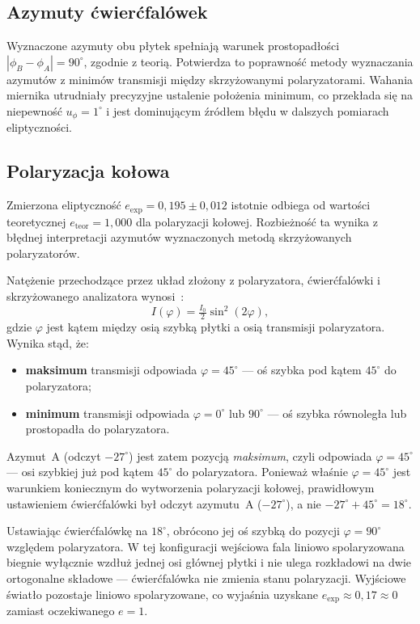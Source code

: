 \documentclass[12pt, a4paper]{article}
\begin{document}
\subsection{Azymuty ćwierćfalówek}

Wyznaczone azymuty obu płytek spełniają warunek prostopadłości
$|\phi_B - \phi_A| = 90^{\circ}$, zgodnie z teorią.
Potwierdza to poprawność metody wyznaczania azymutów z minimów transmisji między
skrzyżowanymi polaryzatorami. Wahania miernika utrudniały precyzyjne ustalenie
położenia minimum, co przekłada się na niepewność $u_\phi = 1^{\circ}$ i jest
dominującym źródłem błędu w dalszych pomiarach eliptyczności.

\subsection{Polaryzacja kołowa}

Zmierzona eliptyczność $e_\text{exp} = 0{,}195 \pm 0{,}012$ istotnie odbiega od
wartości teoretycznej $e_\text{teor} = 1{,}000$ dla polaryzacji kołowej.
Rozbieżność ta wynika z błędnej interpretacji azymutów wyznaczonych metodą
skrzyżowanych polaryzatorów.

Natężenie przechodzące przez układ złożony z polaryzatora, ćwierćfalówki
i skrzyżowanego analizatora wynosi~\cite{skrypt}:
\begin{equation}
    I(\varphi) = \tfrac{I_0}{2}\sin^2(2\varphi),
    \label{eq:qwp_cross}
\end{equation}
gdzie $\varphi$ jest kątem między osią szybką płytki a osią transmisji polaryzatora.
Wynika stąd, że:
\begin{itemize}
    \item \textbf{maksimum} transmisji odpowiada $\varphi = 45^{\circ}$ ---
          oś szybka pod kątem $45^{\circ}$ do polaryzatora;
    \item \textbf{minimum} transmisji odpowiada $\varphi = 0^{\circ}$ lub $90^{\circ}$ ---
          oś szybka równoległa lub prostopadła do polaryzatora.
\end{itemize}
Azymut~A (odczyt $-27^{\circ}$) jest zatem pozycją \emph{maksimum}, czyli
odpowiada $\varphi = 45^{\circ}$ --- osi szybkiej już pod kątem $45^{\circ}$
do polaryzatora. Ponieważ właśnie $\varphi = 45^{\circ}$ jest warunkiem koniecznym
do wytworzenia polaryzacji kołowej, prawidłowym ustawieniem ćwierćfalówki był
odczyt azymutu~A ($-27^{\circ}$), a nie $-27^{\circ} + 45^{\circ} = 18^{\circ}$.

Ustawiając ćwierćfalówkę na $18^{\circ}$, obrócono jej oś szybką do pozycji
$\varphi = 90^{\circ}$ względem polaryzatora. W tej konfiguracji wejściowa
fala liniowo spolaryzowana biegnie wyłącznie wzdłuż jednej osi głównej płytki
i nie ulega rozkładowi na dwie ortogonalne składowe --- ćwierćfalówka nie zmienia
stanu polaryzacji. Wyjściowe światło pozostaje liniowo spolaryzowane, co wyjaśnia
uzyskane $e_\text{exp} \approx 0{,}17 \approx 0$ zamiast oczekiwanego $e = 1$.
\end{document}
